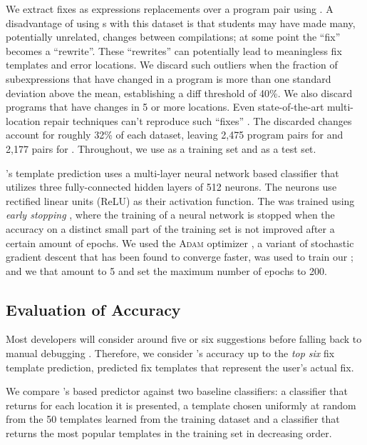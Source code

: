 %
We extract fixes as expressions replacements over a program pair using \diffsym.
A disadvantage of using \diffsym s with this dataset is that students may have
made many, potentially unrelated, changes between compilations; at some point
the ``fix'' becomes a ``rewrite''. These ``rewrites'' can potentially lead to
meaningless fix templates and error locations. We discard such outliers when the
fraction of subexpressions that have changed in a program is more than one
standard deviation above the mean, establishing a diff threshold of 40\%. We
also discard programs that have changes in 5 or more locations. Even
state-of-the-art multi-location repair techniques can't reproduce such ``fixes''
\citep{Saha_2019}. The discarded changes account for roughly 32\% of each
dataset, leaving 2,475 program pairs for \SPRING and 2,177 pairs for \FALL.
Throughout, we use \SPRING as a training set and \FALL as a test set.

%
\toolname's template prediction 
uses a multi-layer neural network \dnn based 
classifier that utilizes three fully-connected 
hidden layers of 512 neurons. The neurons use
rectified linear units (ReLU) as their activation 
function.
%
The \dnn was trained using \emph{early stopping} 
\cite{Hastie2009-bn}, where the training of a neural 
network is stopped when the accuracy on a distinct 
small part of the training set is not improved after 
a certain amount of epochs.
%
We used the \textsc{Adam} optimizer \citep{Kingma2014-ng}, 
a variant of stochastic gradient descent that has 
been found to converge faster, was used to train 
our \dnn; and we that amount to 5  
and set the maximum number of epochs to 200. 

\subsection{Evaluation of Accuracy}

\label{sec:eval:accuracy}

Most developers will consider around five or six suggestions before
falling back to manual debugging \citep{Kochhar2016-oc}. 
%
Therefore, we consider \toolname's accuracy up to the \emph{top six} 
fix template prediction, \ie predicted fix templates that represent 
the user's actual fix. 

%
We compare \toolname's \dnn based predictor against two baseline 
classifiers: a \random classifier that returns 
for each location it is presented, a template 
chosen uniformly at random from the 50 templates 
learned from the \SPRING training dataset and 
a \popular classifier that returns the most 
popular templates in the training set in 
decreasing order. 

